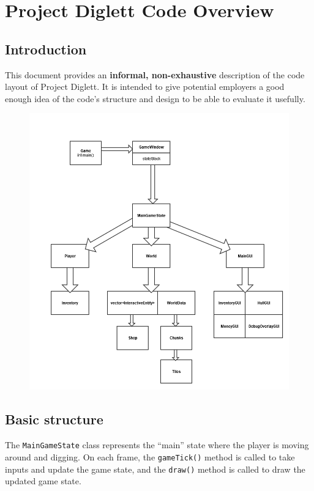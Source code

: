 \documentclass[10pt,twoside,a4paper]{article}
\begin{document}
\section*{Project Diglett Code Overview}

\subsection*{Introduction}

This document provides an \textbf{informal, non-exhaustive} description of the code layout of Project Diglett. It is intended to give potential employers a good enough idea of the code's structure and design to be able to evaluate it usefully.

\begin{figure}[H]
\centering \includegraphics[scale=0.5]{diagram.png}
\end{figure}

\subsection*{Basic structure}

The \verb|MainGameState| class represents the ``main'' state where the player is moving around and digging. On each frame, the \verb|gameTick()| method is called to take inputs and update the game state, and the \verb|draw()| method is called to draw the updated game state.
\end{document}
